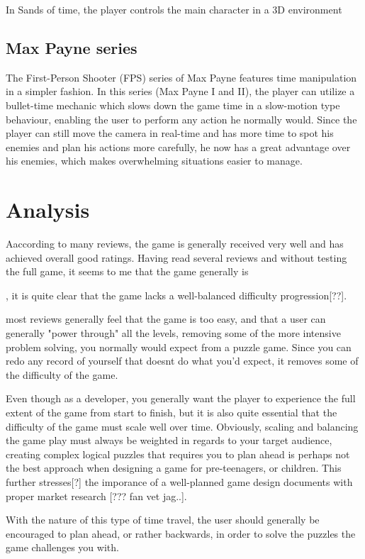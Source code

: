 In Sands of time, the player controls the main character in a 3D environment 

\subsection{Max Payne series}
The First-Person Shooter (FPS) series of Max Payne features time manipulation in a simpler fashion. In this series (Max Payne I and II), 
the player can utilize a bullet-time mechanic which slows down the game time in a slow-motion type behaviour, enabling the user to perform any action he normally would.
Since the player can still move the camera in real-time and has more time to spot his enemies and plan his actions more carefully, 
he now has a great advantage over his enemies, which makes overwhelming situations easier to manage. 


\section{Analysis}
Aaccording to many reviews, the game is generally received very well and has achieved overall good ratings. Having read several reviews and without testing the full game, it seems to me that the game generally is 

, it is quite clear that the game lacks a well-balanced difficulty progression[??]. 

most reviews generally feel that the game is too easy,
 and that a user can generally "power through" all the levels, removing some of the more intensive problem solving, you normally would expect from a puzzle game. Since you can
 redo any record of yourself that doesnt do what you'd expect, it removes some of the difficulty of the game.

Even though as a developer, you generally want the player to experience the full extent of the game from start to finish, but it is also quite essential
 that the difficulty of the game must scale well over time. Obviously, scaling and balancing the game play must always be weighted in regards to your target audience,
 creating complex logical puzzles that requires you to plan ahead is perhaps not the best approach when designing a game for pre-teenagers, or children. 
This further stresses[?] the imporance of a well-planned game design documents with proper market research [??? fan vet jag..]. 

With the nature of this type of time travel, the user should generally be encouraged to plan ahead, or rather backwards, in order to solve the puzzles the game challenges you with. 




